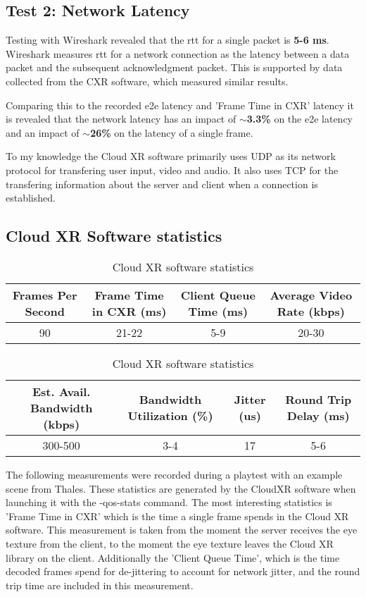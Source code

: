 \subsection{Test 2: Network Latency}
\label{sec:res:t2}
Testing with Wireshark \parencite{wireshark} revealed that the \acrfull{rtt} for a single packet is \textbf{5-6 ms}. Wireshark measures \acrshort{rtt} for a network connection as the latency between a data packet and the subsequent acknowledgment packet. This is supported by data collected from the CXR \parencite{cloudxr} software, which measured similar results. 

Comparing this to the recorded \acrshort{e2e} latency and 'Frame Time in CXR' latency it is revealed that the network latency has an impact of \textbf{$\sim$3.3\%} on the \acrshort{e2e} latency and an impact of \textbf{$\sim$26\%} on the latency of a single frame.

To my knowledge the Cloud XR software primarily uses UDP as its network protocol for transfering user input, video and audio. It also uses TCP for the transfering information about the server and client when a connection is established.

\subsection{Cloud XR Software statistics}
\label{sec:res:t3}
\begin{table}[h!]
\begin{center}
\caption{Cloud XR software statistics}
\begin{tabular}{|c|c|c|c|}
\hline
Frames Per Second & Frame Time in CXR (\acrshort{ms}) & Client Queue Time (\acrshort{ms}) & Average Video Rate (kbps)  \\ \hline
90 & 21-22 & 5-9 & 20-30 \\ \hline
\end{tabular}
\begin{tabular}{|c|c|c|c|}
\hline
Est. Avail. Bandwidth (kbps) & Bandwidth Utilization (\%) & Jitter (\acrshort{us}) & Round Trip Delay (\acrshort{ms}) \\ \hline
300-500 & 3-4 & 17 & 5-6 \\ \hline
\end{tabular}
\end{center}
\end{table}

The following measurements were recorded during a playtest with an example scene from Thales. These statistics are generated by the CloudXR software when launching it with the -qos-stats command. The most interesting statistics is 'Frame Time in CXR' which is the time a single frame spends in the Cloud XR software. This measurement is taken from the moment the server receives the eye texture from the client, to the moment the eye texture leaves the Cloud XR library on the client. Additionally the 'Client Queue Time', which is the time decoded frames spend for de-jittering to account for network  jitter, and the round trip time are included in this measurement.